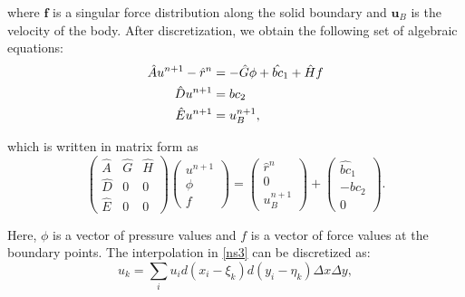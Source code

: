 \documentclass{tufte-handout}
\begin{document}
\noindent where $\mathbf{f}$ is a singular force distribution along the solid boundary and $\mathbf{u}_B$ is the velocity of the body. 
After discretization, we obtain the following set of algebraic equations:
%
%
\begin{align}
	\hat{A}u^{n+1} - \hat{r}^n & = - \hat{G}\phi + \hat{bc}_1 + \hat{H}f \notag \\
	\hat{D}u^{n+1} & = bc_2
	\label{disns} \\
	\hat{E}u^{n+1} & = u_B^{n+1}, \notag
\end{align}

\noindent which is written in matrix form as
%
\begin{equation}\label{eqn:disnsmat}
	\left(
		\begin{array}{ccc}
			\hat{A} & \hat{G} & \hat{H} \\
			\hat{D} & 0 & 0 \\
			\hat{E} & 0 & 0\end{array}
	\right)
	\left(
		\begin{array}{c}
			u^{n+1} \\
			\phi \\
			f
		\end{array}
	\right)
	=
	\left(
		\begin{array}{c}
			\hat{r}^n \\
			0 \\
			u_B^{n+1}
		\end{array}
	\right)
	+
	\left(
		\begin{array}{c}
			\hat{bc}_1 \\
			-bc_2 \\
			0
		\end{array}
	\right).
\end{equation}

\noindent
Here, $\phi$ is a vector of pressure values and $f$ is a vector of force values at the boundary points. The interpolation in \eqref{ns3} can be discretized as:
%
\begin{equation}
	u_k = \sum_{i}{u_i}d(x_i-\xi_k)d(y_i-\eta_k)\Delta{x}\Delta{y},
\end{equation}
\end{document}

